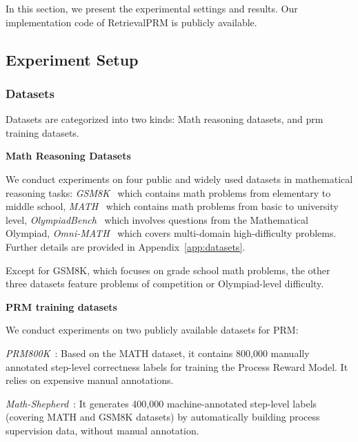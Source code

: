 In this section, we present the experimental settings and results. Our implementation code of RetrievalPRM is publicly available.



\subsection{Experiment Setup}
\subsubsection{Datasets}
Datasets are categorized into two kinds: Math reasoning datasets, and prm training datasets.

\noindent \textbf{Math Reasoning Datasets}

We conduct experiments on four public and widely used datasets in mathematical reasoning tasks: \textit{GSM8K}~\cite{gsm8k} which contains math problems from elementary to middle school, \textit{MATH}~\cite{hendrycks2021measuring} which contains math problems from basic to university level, \textit{OlympiadBench}~\cite{he2024olympiadbenchchallengingbenchmarkpromoting} which involves questions from the Mathematical Olympiad, \textit{Omni-MATH}~\cite{gao2024omnimathuniversalolympiadlevel} which covers multi-domain high-difficulty problems. Further details are provided in Appendix~\ref{app:datasets}.


Except for GSM8K, which focuses on grade school math problems, the other three datasets feature problems of competition or Olympiad-level difficulty.

\noindent \textbf{PRM training datasets}

We conduct experiments on two publicly available datasets for PRM:

\textit{PRM800K}~\cite{lightman2023let}: Based on the MATH dataset, it contains 800,000 manually annotated step-level correctness labels for training the Process Reward Model. It relies on expensive manual annotations.

\textit{Math-Shepherd}~\cite{wang2024math}: It generates 400,000 machine-annotated step-level labels (covering MATH and GSM8K datasets) by automatically building process supervision data, without manual annotation.

